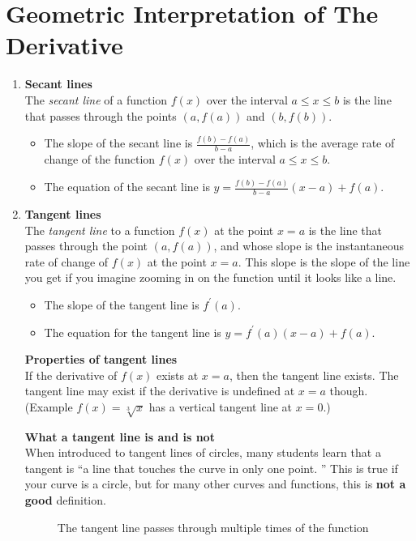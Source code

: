 \section{Geometric Interpretation of The Derivative}
\begin{enumerate}
    \item \textbf{Secant lines}\\
        \indent The \textit{secant line} of a function \(f(x)\) over the interval \(a\leq x\leq b\) is the line that passes through the points \((a,f(a))\) and \((b,f(b))\).
        \begin{itemize}
            \item The slope of the secant line is \(\frac{f(b)-f(a)}{b-a}\), which is the average rate of change of the function \(f(x)\) over the interval \(a\leq x\leq b\).
            \item The equation of the secant line is \(y=\frac{f(b)-f(a)}{b-a}(x-a)+f(a)\).
        \end{itemize}
    \item \textbf{Tangent lines}\\
        \indent The \textit{tangent line} to a function \(f(x)\) at the point \(x=a\) is the line that passes through the point \((a,f(a))\), and whose slope is the instantaneous rate of change of \(f(x)\) at the point \(x=a\). This slope is the slope of the line you get if you imagine zooming in on the function until it looks like a line.
        \begin{itemize}
            \item The slope of the tangent line is \(f^\prime(a)\).
            \item The equation for the tangent line is \(y=f^\prime(a)(x-a)+f(a)\).
        \end{itemize}
        \noindent\textbf{Properties of tangent lines}\\
        If the derivative of \(f(x)\) exists at \(x=a\), then the tangent line exists. The tangent line may exist if the derivative is undefined at \(x=a\) though. (Example \(f(x)=\sqrt[3]{x}\) has a vertical tangent line at \(x=0\).)\par
        \noindent\textbf{What a tangent line is and is not}\\
        When introduced to tangent lines of circles, many students learn that a tangent is ``a line that touches the curve in only one point. '' This is true if your curve is a circle, but for many other curves and functions, this is \textbf{not a good} definition.
        \begin{figure}[H]
            \centering
            \caption{The tangent line passes through multiple times of the function}
        \end{figure}
\end{enumerate}

